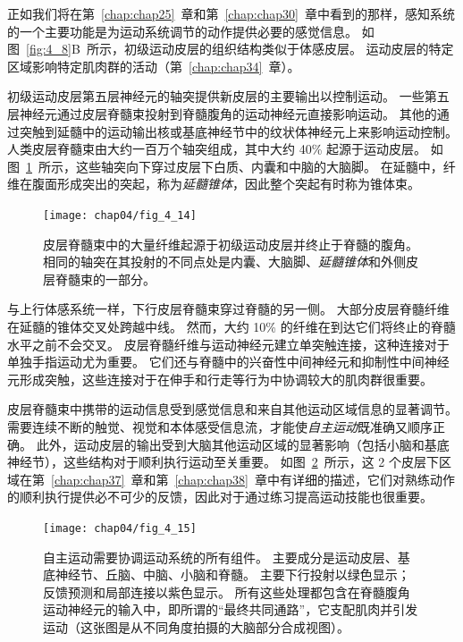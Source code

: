 正如我们将在第~\ref{chap:chap25}~章和第~\ref{chap:chap30}~章中看到的那样，感知系统的一个主要功能是为运动系统调节的动作提供必要的感觉信息。 
如图~\ref{fig:4_8}B~所示，初级运动皮层的组织结构类似于体感皮层。 
运动皮层的特定区域影响特定肌肉群的活动（第~\ref{chap:chap34}~章）。


初级运动皮层第五层神经元的轴突提供新皮层的主要输出以控制运动。
一些第五层神经元通过皮层脊髓束投射到脊髓腹角的运动神经元直接影响运动。
其他的通过突触到延髓中的运动输出核或基底神经节中的纹状体神经元上来影响运动控制。
人类皮层脊髓束由大约一百万个轴突组成，其中大约 40\% 起源于运动皮层。
如图~\ref{fig:4_14}~所示，这些轴突向下穿过皮层下白质、内囊和中脑的大脑脚。
在延髓中，纤维在腹面形成突出的突起，称为\textit{延髓锥体}，因此整个突起有时称为锥体束。


\begin{figure}[htbp]
	\centering
	\texttt{[image: chap04/fig\_4\_14]}
	\caption{皮层脊髓束中的大量纤维起源于初级运动皮层并终止于脊髓的腹角。
		相同的轴突在其投射的不同点处是内囊、大脑脚、\textit{延髓锥体}和外侧皮层脊髓束的一部分。}
	\label{fig:4_14}
\end{figure}


与上行体感系统一样，下行皮层脊髓束穿过脊髓的另一侧。 
大部分皮层脊髓纤维在延髓的锥体交叉处跨越中线。
然而，大约 10\% 的纤维在到达它们将终止的脊髓水平之前不会交叉。 
皮层脊髓纤维与运动神经元建立单突触连接，这种连接对于单独手指运动尤为重要。 
它们还与脊髓中的兴奋性中间神经元和抑制性中间神经元形成突触，这些连接对于在伸手和行走等行为中协调较大的肌肉群很重要。


皮层脊髓束中携带的运动信息受到感觉信息和来自其他运动区域信息的显著调节。
需要连续不断的触觉、视觉和本体感受信息流，才能使\textit{自主运动}既准确又顺序正确。
此外，运动皮层的输出受到大脑其他运动区域的显著影响（包括小脑和基底神经节），这些结构对于顺利执行运动至关重要。
如图~\ref{fig:4_15}~所示，这 2 个皮层下区域在第~\ref{chap:chap37}~章和第~\ref{chap:chap38}~章中有详细的描述，它们对熟练动作的顺利执行提供必不可少的反馈，因此对于通过练习提高运动技能也很重要。

\begin{figure}[htbp]
	\centering
	\texttt{[image: chap04/fig\_4\_15]}
	\caption{自主运动需要协调运动系统的所有组件。
		主要成分是运动皮层、基底神经节、丘脑、中脑、小脑和脊髓。
		主要下行投射以绿色显示；
		反馈预测和局部连接以紫色显示。
		所有这些处理都包含在脊髓腹角运动神经元的输入中，即所谓的“最终共同通路”，它支配肌肉并引发运动（这张图是从不同角度拍摄的大脑部分合成视图）。}
	\label{fig:4_15}
\end{figure}



